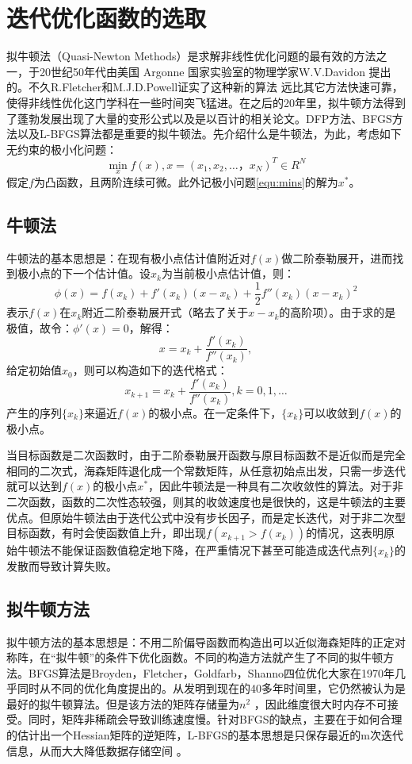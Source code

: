 \documentclass[oneside]{ZJUthesis}
\begin{document}
\section{迭代优化函数的选取}
拟牛顿法（Quasi-Newton Methods）是求解非线性优化问题的最有效的方法之一，于20世纪50年代由美国 Argonne 国家实验室的物理学家W.V.Davidon 提出的。不久R.Fletcher和M.J.D.Powell证实了这种新的算法 远比其它方法快速可靠，使得非线性优化这门学科在一些时间突飞猛进。在之后的20年里，拟牛顿方法得到了蓬勃发展出现了大量的变形公式以及是以百计的相关论文。DFP方法、BFGS方法以及L-BFGS算法都是重要的拟牛顿法。先介绍什么是牛顿法，为此，考虑如下无约束的极小化问题：
\begin{equation}
	\label{equ:mins}
	\min_{x}{f(x)},x=(x_1,x_2,\dots，x_N )^T \in R^N 
\end{equation}
假定$f$为凸函数，且两阶连续可微。此外记极小问题\ref{equ:mins}的解为$x^*$。
\subsection{牛顿法}
牛顿法的基本思想是：在现有极小点估计值附近对$f(x)$做二阶泰勒展开，进而找到极小点的下一个估计值。设$x_k$为当前极小点估计值，则：
\begin{equation}
	\phi(x)=f(x_k )+f'(x_k )(x-x_k )+\frac{1}{2}f''(x_k )(x-x_k )^2
\end{equation}
表示$f(x)$在$x_k$附近二阶泰勒展开式（略去了关于$x-x_k $的高阶项）。由于求的是极值，故令：$\phi '(x)=0$，解得：
\begin{equation}
	x=x_k +\frac{f'(x_k )}{f''(x_k )},
\end{equation}
给定初始值$x_0 $，则可以构造如下的迭代格式：
\begin{equation}
	x_{k+1 }=x_k +\frac{f'(x_k )}{f''(x_k )},k=0,1,\dots
\end{equation}
产生的序列$\{x_k \}$来逼近$f(x)$的极小点。在一定条件下，$\{x_k \}$可以收敛到$f(x)$的极小点。

当目标函数是二次函数时，由于二阶泰勒展开函数与原目标函数不是近似而是完全相同的二次式，海森矩阵退化成一个常数矩阵，从任意初始点出发，只需一步迭代就可以达到$f(x)$的极小点$x^*$，因此牛顿法是一种具有二次收敛性的算法。对于非二次函数，函数的二次性态较强，则其的收敛速度也是很快的，这是牛顿法的主要优点。但原始牛顿法由于迭代公式中没有步长因子，而是定长迭代，对于非二次型目标函数，有时会使函数值上升，即出现$f(x_{k+1 }>f(x_k ))$的情况，这表明原始牛顿法不能保证函数值稳定地下降，在严重情况下甚至可能造成迭代点列$\{x_k\}$的发散而导致计算失败。
\subsection{拟牛顿方法}
拟牛顿方法的基本思想是：不用二阶偏导函数而构造出可以近似海森矩阵的正定对称阵，在``拟牛顿''的条件下优化函数。不同的构造方法就产生了不同的拟牛顿方法。BFGS算法是Broyden，Fletcher，Goldfarb，Shanno四位优化大家在1970年几乎同时从不同的优化角度提出的。从发明到现在的40多年时间里，它仍然被认为是最好的拟牛顿算法。但是该方法的矩阵存储量为$n^2$ ，因此维度很大时内存不可接受。同时，矩阵非稀疏会导致训练速度慢。针对BFGS的缺点，主要在于如何合理的估计出一个Hessian矩阵的逆矩阵，L-BFGS的基本思想是只保存最近的m次迭代信息，从而大大降低数据存储空间 。
\end{document}
